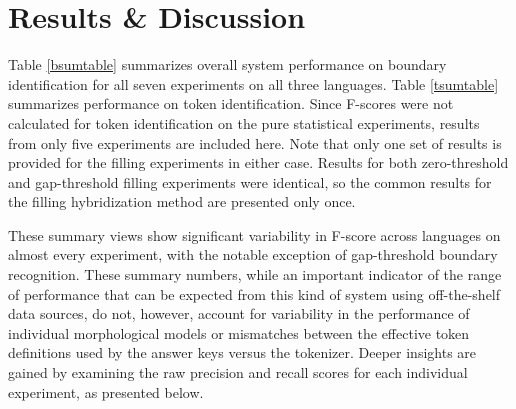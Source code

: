 \chapter{Results \& Discussion}
\FloatBarrier

Table \ref{bsumtable} summarizes overall system performance on boundary identification for all seven experiments on all three languages. Table \ref{tsumtable} summarizes performance on token identification. Since F-scores were not calculated for token identification on the pure statistical experiments, results from only five experiments are included here. Note that only one set of results is provided for the filling experiments in either case. Results for both zero-threshold and gap-threshold filling experiments were identical, so the common results for the filling hybridization method are presented only once.

These summary views show significant variability in F-score across languages on almost every experiment, with the notable exception of gap-threshold boundary recognition. These summary numbers, while an important indicator of the range of performance that can be expected from this kind of system using off-the-shelf data sources, do not, however, account for variability in the performance of individual morphological models or mismatches between the effective token definitions used by the answer keys versus the tokenizer. Deeper insights are gained by examining the raw precision and recall scores for each individual experiment, as presented below.


